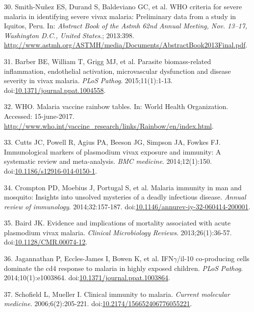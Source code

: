 \documentclass[a4paper]{article}
\begin{document}
\hypertarget{ref-smith2013}{}
30. Smith-Nuñez ES, Durand S, Baldeviano GC, et al. WHO criteria for
severe malaria in identifying severe vivax malaria: Preliminary data
from a study in Iquitos, Peru. In: \emph{Abstract Book of the Astmh 62nd
Annual Meeting, Nov. 13--17, Washington D.C., United States}.; 2013:398.
\url{http://www.astmh.org/ASTMH/media/Documents/AbstractBook2013Final.pdf}.

\hypertarget{ref-barber2015}{}
31. Barber BE, William T, Grigg MJ, et al. Parasite biomass-related
inflammation, endothelial activation, microvascular dysfunction and
disease severity in vivax malaria. \emph{PLoS Pathog}. 2015;11(1):1-13.
doi:\href{https://doi.org/10.1371/journal.ppat.1004558}{10.1371/journal.ppat.1004558}.

\hypertarget{ref-rainbow2016}{}
32. WHO. Malaria vaccine rainbow tables. In: World Health Organization.
Accessed: 15-june-2017.
\url{http://www.who.int/vaccine_research/links/Rainbow/en/index.html}.

\hypertarget{ref-cutts2014meta}{}
33. Cutts JC, Powell R, Agius PA, Beeson JG, Simpson JA, Fowkes FJ.
Immunological markers of plasmodium vivax exposure and immunity: A
systematic review and meta-analysis. \emph{BMC medicine}.
2014;12(1):150.
doi:\href{https://doi.org/10.1186/s12916-014-0150-1}{10.1186/s12916-014-0150-1}.

\hypertarget{ref-crompton2014rev}{}
34. Crompton PD, Moebius J, Portugal S, et al. Malaria immunity in man
and mosquito: Insights into unsolved mysteries of a deadly infectious
disease. \emph{Annual review of immunology}. 2014;32:157-187.
doi:\href{https://doi.org/10.1146/annurev-iy-32-060414-200001}{10.1146/annurev-iy-32-060414-200001}.

\hypertarget{ref-baird2013}{}
35. Baird JK. Evidence and implications of mortality associated with
acute plasmodium vivax malaria. \emph{Clinical Microbiology Reviews}.
2013;26(1):36-57.
doi:\href{https://doi.org/10.1128/CMR.00074-12}{10.1128/CMR.00074-12}.

\hypertarget{ref-jagannathan2014}{}
36. Jagannathan P, Eccles-James I, Bowen K, et al. IFN\(\gamma\)/il-10
co-producing cells dominate the cd4 response to malaria in highly
exposed children. \emph{PLoS Pathog}. 2014;10(1):e1003864.
doi:\href{https://doi.org/10.1371/journal.ppat.1003864}{10.1371/journal.ppat.1003864}.

\hypertarget{ref-schofield2006toll}{}
37. Schofield L, Mueller I. Clinical immunity to malaria. \emph{Current
molecular medicine}. 2006;6(2):205-221.
doi:\href{https://doi.org/10.2174/156652406776055221}{10.2174/156652406776055221}.
\end{document}
